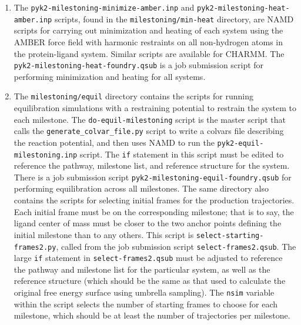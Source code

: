 \documentclass{article}      %
\begin{document}
\begin{enumerate}
\item The \verb+pyk2-milestoning-minimize-amber.inp+ and \verb+pyk2-milestoning-heat-amber.inp+ scripts, found in the \verb+milestoning/min-heat+ directory, are NAMD scripts for carrying out minimization and heating of each system using the AMBER force field with harmonic restraints on all non-hydrogen atoms in the protein-ligand system.  Similar scripts are available for CHARMM.  The \verb+pyk2-milestoning-heat-foundry.qsub+ is a job submission script for performing minimization and heating for all systems.

\item The \verb+milestoning/equil+ directory contains the scripts for running equilibration simulations with a restraining potential to restrain the system to each milestone.  The \verb+do-equil-milestoning+ script is the master script that calls the \verb+generate_colvar_file.py+ script to write a colvars file describing the reaction potential, and then uses NAMD to run the \verb+pyk2-equil-milestoning.inp+ script.  The \verb+if+ statement in this script must be edited to reference the pathway, milestone list, and reference structure for the system.  There is a job submission script \verb+pyk2-milestoning-equil-foundry.qsub+ for performing equilibration across all milestones.   The same directory also contains the scripts for selecting initial frames for the production trajectories.  Each initial frame must be on the corresponding milestone; that is to say, the ligand center of mass must be closer to the two anchor points defining the initial milestone than to any others.  This script is \verb+select-starting-frames2.py+, called from the job submission script \verb+select-frames2.qsub+.  The large \verb+if+ statement in \verb+select-frames2.qsub+ must be adjusted to reference the pathway and milestone list for the particular system, as well as the reference structure (which should be the same as that used to calculate the original free energy surface using umbrella sampling).   The \verb+nsim+ variable within the script selects the number of starting frames to choose for each milestone, which should be at least the number of trajectories per milestone.


\end{enumerate}
\end{document}
